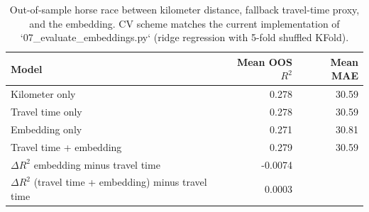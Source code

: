 \begin{table}[h!]
\centering
\caption{Out-of-sample horse race between kilometer distance, fallback travel-time proxy, and the embedding. CV scheme matches the current implementation of `07_evaluate_embeddings.py` (ridge regression with 5-fold shuffled KFold).}
\label{tab:osrm-vs-embedding}
\small
\begin{tabular}{lrr}
\toprule
Model & Mean OOS $R^2$ & Mean MAE \\
\midrule
Kilometer only & 0.278 & 30.59 \\
Travel time only & 0.278 & 30.59 \\
Embedding only & 0.271 & 30.81 \\
Travel time + embedding & 0.279 & 30.59 \\
\midrule
$\Delta R^2$ embedding minus travel time & -0.0074 & \\
$\Delta R^2$ (travel time + embedding) minus travel time & 0.0003 & \\
\bottomrule
\end{tabular}
\end{table}
